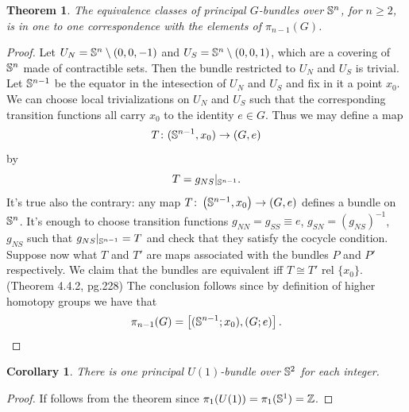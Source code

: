 \documentclass{article}
\newtheorem{thm}{Theorem}
\newtheorem{cor}{Corollary}
\theoremstyle{definition}
\theoremstyle{remark}
\begin{document}
\begin{thm}
    The equivalence classes of principal \(G\)-bundles over \(\mathbb{S}^n\), for \(n\geq 2\), is in one to one correspondence with the elements of \(\pi_{n-1}(G)\).
\end{thm}
\begin{proof}
    Let \(U_N=\mathbb{S}^n\setminus (0,0,-1)\) and \(U_S=\mathbb{S}^n\setminus (0,0,1)\), which are a covering of \(\mathbb{S}^n\) made of contractible sets. Then the bundle restricted to \(U_N\) and \(U_S\) is trivial. Let \(\mathbb{S}^{n-1}\) be the equator in the intesection of \(U_N\) and \(U_S\) and fix in it a point \(x_0\). We can choose local trivializations on \(U_N\) and \(U_S\) such that the corresponding transition functions all carry \(x_0\) to the identity \(e\in G\). Thus we may define a map 
    \[T\colon (\mathbb{S}^{n-1},x_0)\to (G,e)\]
    by
    \[T=g_{NS}|_{\mathbb{S}^{n-1}}.\]
    It's true also the contrary: any map \(T\colon \left(\mathbb{S}^{n-1},x_0\right) \to (G,e)\) defines a bundle on \(\mathbb{S}^n\). It's enough to choose transition functions \(g_{NN}=g_{SS}\equiv e\), \(g_{SN}=(g_{NS})^{-1}\), \(g_{NS}\) such that \(g_{NS}|_{\mathbb{S}^{n-1}}=T\) and check that they satisfy the cocycle condition.
    Suppose now what \(T\) and \(T'\) are maps associated with the bundles \(P\) and \(P'\) respectively. We claim that the bundles are equivalent iff \(T\cong T'\) rel \(\{x_0\}\). (Theorem 4.4.2, pg.228)
    The conclusion follows since by definition of higher homotopy groups we have that 
    \[\pi_{n-1}(G) = \left[ (\mathbb{S}^{n-1};x_0),(G;e) \right].\]
\end{proof}

\begin{cor}
    There is one principal \(U(1)\)-bundle over \(\mathbb{S}^2\) for each integer.
\end{cor}
\begin{proof}
    If follows from the theorem since \(\pi_1(U(1))=\pi_1(\mathbb{S}^1)=\mathbb{Z}\).
\end{proof}
\end{document}
